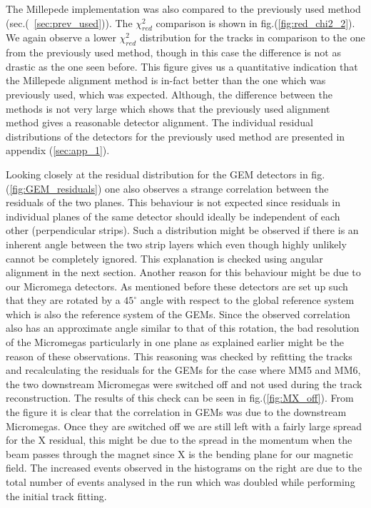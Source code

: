  The Millepede implementation was also compared to the previously used method (sec.(~\ref{sec:prev_used})). The $\chi_{red}^2$ comparison is shown in fig.(\ref{fig:red_chi2_2}). We again observe a lower $\chi_{red}^2$ distribution for the tracks in comparison to the one from the previously used method, though in this case the difference is not as drastic as the one seen before. This figure gives us a quantitative indication that the Millepede alignment method is in-fact better than the one which was previously used, which was expected. Although, the difference between the methods is not very large which shows that the previously used alignment method gives a reasonable detector alignment.
The individual residual distributions of the detectors for the previously used method are presented in appendix (\ref{sec:app_1}).

Looking closely at the residual distribution for the GEM detectors in fig.(\ref{fig:GEM_residuals}) one also observes a strange correlation between the residuals of the two planes. This behaviour is not expected since residuals in individual planes of the same detector should ideally be independent of each other (perpendicular strips). Such a distribution might be observed if there is an inherent angle between the two strip layers which even though highly unlikely cannot be completely ignored. This explanation is checked using angular alignment in the next section. Another reason for this behaviour might be due to our Micromega detectors. As mentioned before these detectors are set up such that they are rotated by a $45^{\circ}$ angle with respect to the global reference system which is also the reference system of the GEMs. Since the observed correlation also has an approximate angle similar to that of this rotation, the bad resolution of the Micromegas particularly in one plane as explained earlier might be the reason of these observations. This reasoning was checked by refitting the tracks and recalculating the residuals for the GEMs for the case where MM5 and MM6, the two downstream Micromegas were switched off and not used during the track reconstruction. The results of this check can be seen in fig.(\ref{fig:MX_off}). From the figure it is clear that the correlation in GEMs was due to the downstream Micromegas. Once they are switched off we are still left with a fairly large spread for the X residual, this might be due to the spread in the momentum when the beam passes through the magnet since X is the bending plane for our magnetic field.
The increased events observed in the histograms on the right are due to the total number of events analysed in the run which was doubled while performing the initial track fitting.

